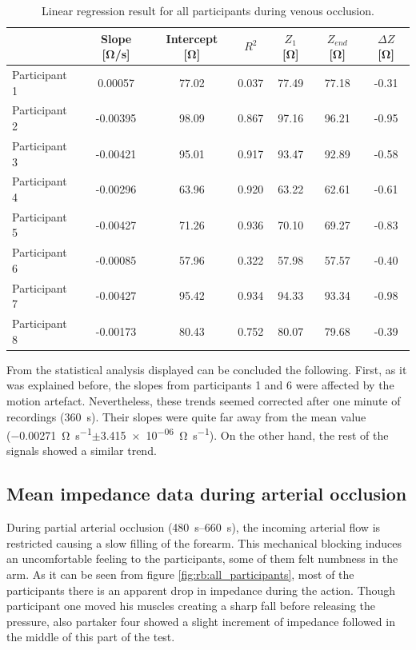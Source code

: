\begin{table}[htbp]
	\caption{Linear regression result for all participants during venous occlusion.}
	\label{tbl:venous_occlusion:region2}
	\centering
	\begin{tabu}{lcccccc}
		\toprule
		& \textbf{Slope [\si{\ohm/\second}]} & \textbf{Intercept [\si{\ohm}]} & \textbf{$R^2$} & \textbf{$Z_1$ [\si{\ohm}]} & \textbf{$Z_{end}$ [\si{\ohm}]} & \textbf{ $\Delta Z$ [\si{\ohm}]} \\ \midrule
		Participant 1  &   0.00057  &  77.02   &     0.037  &  77.49  &  77.18  &  -0.31\\
		Participant 2  &  -0.00395  &  98.09   &     0.867  &  97.16  &  96.21  &  -0.95\\
		Participant 3  &  -0.00421  &  95.01   &     0.917  &  93.47  &  92.89  &  -0.58\\
		Participant 4  &  -0.00296  &  63.96   &     0.920  &  63.22  &  62.61  &  -0.61\\
		Participant 5  &  -0.00427  &  71.26   &     0.936  &  70.10  &  69.27  &  -0.83\\
		Participant 6  &  -0.00085  &  57.96   &     0.322  &  57.98  &  57.57  &  -0.40\\
		Participant 7  &  -0.00427  &  95.42   &     0.934  &  94.33  &  93.34  &  -0.98\\
		Participant 8  &  -0.00173  &  80.43   &     0.752  &  80.07  &  79.68  &  -0.39\\ \bottomrule
	\end{tabu} 
\end{table}

From the statistical analysis displayed can be concluded the following. First, as it was explained before, the slopes from participants 1 and 6 were affected by the motion artefact. Nevertheless, these trends seemed corrected after one minute of recordings (\SI{360}{\second}). Their slopes were quite far away from the mean value (\SI{-0.00271}{\ohm\per\second}$\pm$\SI{3.415e-06}{\ohm\per\second}). On the other hand, the rest of the signals showed a similar trend. 


\subsection{Mean impedance data during arterial occlusion}
\label{section5.2.3}
During partial arterial occlusion (\SIrange{480}{660}{\second}), the incoming arterial flow is restricted causing a slow filling of the forearm. This mechanical blocking induces an uncomfortable feeling to the participants, some of them felt numbness in the arm.  As it can be seen from figure \ref{fig:rb:all_participants}, most of the participants there is an apparent drop in impedance during the action. Though participant one moved his muscles creating a sharp fall before releasing the pressure, also partaker four showed a slight increment of impedance followed in the middle of this part of the test. 

